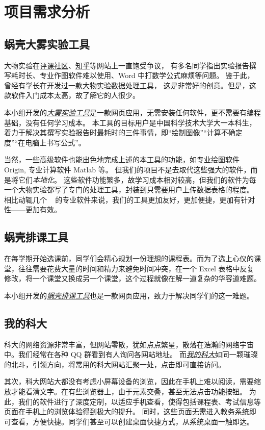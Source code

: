 \section{项目需求分析}

\subsection{蜗壳大雾实验工具}

大物实验在\href{https://icourse.club/course/12716/}{评课社区}、\href{https://www.zhihu.com/question/35867101}{知乎}等网站上一直饱受争议，
有多名同学指出实验报告撰写耗时长、专业作图软件难以使用、Word 中打数学公式麻烦等问题。
鉴于此，曾经有学长在开发过一款\href{https://github.com/regymm/PhysicsExp}{大物实验数据处理工具}，
这是非常好的创意。但是，这款软件入门成本太高，故了解它的人很少。

本小组开发的\href{https://dawu.feixu.site/}{\emph{大雾实验工具}}是一款网页应用，无需安装任何软件，更不需要有编程基础，没有任何学习成本。
本工具的目标用户是中国科学技术大学大一本科生，着力于解决其撰写实验报告时最耗时的三件事情，即“绘制图像”“计算不确定度”“在电脑上书写公式”。

当然，一些高级软件也能出色地完成上述的本工具的功能，如专业绘图软件 Origin, 专业计算软件 Matlab 等。
但我们的项目不是去取代这些强大的软件，而是将它们\emph{本地化}。
这些软件功能繁多，故学习成本相对较高，但我们的软件为每一个大物实验都写了专门的处理工具，封装到只需要用户上传数据表格的程度。
相比动辄几个 \unit{\giga\byte} 的专业软件来说，我们的工具更加友好，更加便捷，更加有针对性——更加有效。

\subsection{蜗壳排课工具}

在每学期开始选课前，同学们会精心规划一份理想的课程表。而为了选上心仪的课堂，往往需要花费大量的时间和精力来避免时间冲突，在一个 Excel 表格中反复修改，将一个课堂又换成另一个课堂，这个过程就像在解一道复杂的华容道难题。

本小组开发的\href{https://paike.feixu.site/}{\emph{蜗壳排课工具}}也是一款网页应用，致力于解决同学们的这一难题。

\subsection{我的科大}

科大的网络资源非常丰富，但网站零散，犹如点点繁星，散落在浩瀚的网络宇宙中。我们经常在各种 QQ 群看到有人询问各网站地址。
而\href{https://myustc.feixu.site/}{\emph{我的科大}}如同一颗璀璨的北斗，引领方向，将常用的科大网站汇聚一处，点击即可直接访问。

其次，科大网站大都没有考虑小屏幕设备的浏览，因此在手机上难以阅读，需要缩放才能看清文字。在有些浏览器上，由于元素交叠，甚至无法点击功能按钮。
为此，我们的软件进行了深度定制，以适应手机查看，使得包括课程表、考试信息等页面在手机上的浏览体验得到极大的提升。
同时，这些页面无需进入教务系统即可查看，方便快捷。同学们甚至可以创建桌面快捷方式，从系统桌面一触即达。
